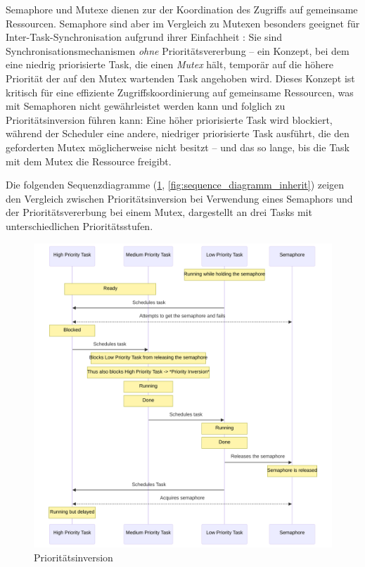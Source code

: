 Semaphore und Mutexe dienen zur der Koordination des Zugriffs auf gemeinsame
Ressourcen. Semaphore sind aber im Vergleich zu Mutexen besonders geeignet für
Inter-Task-Synchronisation aufgrund ihrer Einfachheit
\cite{freertos_semphr_doc}: Sie sind Synchronisationsmechanismen \textit{ohne}
Prioritätsvererbung -- ein Konzept, bei dem eine niedrig priorisierte Task, die
einen \textit{Mutex} hält, temporär auf die höhere Priorität der auf den Mutex
wartenden Task angehoben wird. Dieses Konzept ist kritisch für eine effiziente
Zugriffskoordinierung auf gemeinsame Ressourcen, was mit Semaphoren nicht
gewährleistet werden kann und folglich zu Prioritätsinversion führen kann: Eine
höher priorisierte Task wird blockiert, während der Scheduler eine andere,
niedriger priorisierte Task ausführt, die den geforderten Mutex möglicherweise
nicht besitzt -- und das so lange, bis die Task mit dem Mutex die Ressource
freigibt.

Die folgenden Sequenzdiagramme (\ref{fig:sequence_diagramm_invert},
\ref{fig:sequence_diagramm_inherit}) zeigen den Vergleich zwischen
Prioritätsinversion bei Verwendung eines Semaphors und der Prioritätsvererbung
bei einem Mutex, dargestellt an drei Tasks mit unterschiedlichen
Prioritätsstufen.

\begin{figure}[H]
    \centering
    \includegraphics[width=1\textwidth]{assets/prio_inversion}
    \caption{Prioritätsinversion}
    \label{fig:sequence_diagramm_invert}
\end{figure}

